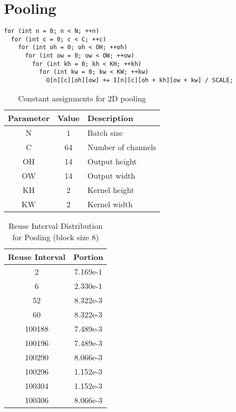 \documentclass[conference]{article}
\begin{document}
\section{Pooling}
\begin{verbatim}
for (int n = 0; n < N; ++n)
  for (int c = 0; c < C; ++c)
    for (int oh = 0; oh < OH; ++oh)
      for (int ow = 0; ow < OW; ++ow)
        for (int kh = 0; kh < KH; ++kh)
          for (int kw = 0; kw < KW; ++kw)
            O[n][c][oh][ow] += I[n][c][oh + kh][ow + kw] / SCALE;    
\end{verbatim}

\begin{table}[H]
\centering
\begin{tabular}{|c|c|l|}
\hline
Parameter & Value & Description \\
\hline
N & 1 & Batch size \\
C & 64 & Number of channels \\
OH & 14 & Output height \\
OW & 14 & Output width \\
KH & 2 & Kernel height \\
KW & 2 & Kernel width \\
\hline
\end{tabular}
\caption{Constant assignments for 2D pooling}
\end{table}

\begin{table}[H]
\centering
\begin{tabular}{|c|c|}
    \hline
    Reuse Interval & Portion \\ 
    \hline
    2 & 7.169e-1 \\ 
    6 & 2.330e-1 \\ 
    52 & 8.322e-3 \\ 
    60 & 8.322e-3 \\ 
    100188 & 7.489e-3 \\ 
    100196 & 7.489e-3 \\ 
    100290 & 8.066e-3 \\ 
    100296 & 1.152e-3 \\ 
    100304 & 1.152e-3 \\ 
    100306 & 8.066e-3 \\ 
    \hline
\end{tabular}
\caption{Reuse Interval Distribution for Pooling (block size 8)}
\end{table}
\end{document}

